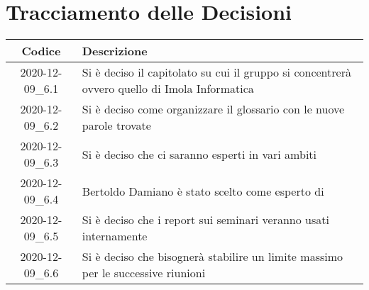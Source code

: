 \section*{Tracciamento delle Decisioni}

\begin{center}
	\begin{longtable}{|c|p{13cm}|}
	\hline
	\rowcolor{lighter-grayer}
	\textbf{Codice} & \textbf{Descrizione} \\
	\hline
	\endfirsthead

	
	2020-12-09\_6.1 & Si è deciso il capitolato su cui il gruppo si concentrerà ovvero quello di Imola Informatica \\
	\hline
	2020-12-09\_6.2 & Si è deciso come organizzare il glossario con le nuove parole trovate \\
	\hline
	2020-12-09\_6.3 & Si è deciso che ci saranno esperti in vari ambiti \\
	\hline
	2020-12-09\_6.4 & Bertoldo Damiano è stato scelto come esperto di \glock{\LaTeX} \\
	\hline
	2020-12-09\_6.5 & Si è deciso che i report sui seminari veranno usati internamente \\
	\hline
	2020-12-09\_6.6 & Si è deciso che bisognerà stabilire un limite massimo per le successive riunioni  \\
	\hline

	\end{longtable}
\end{center}